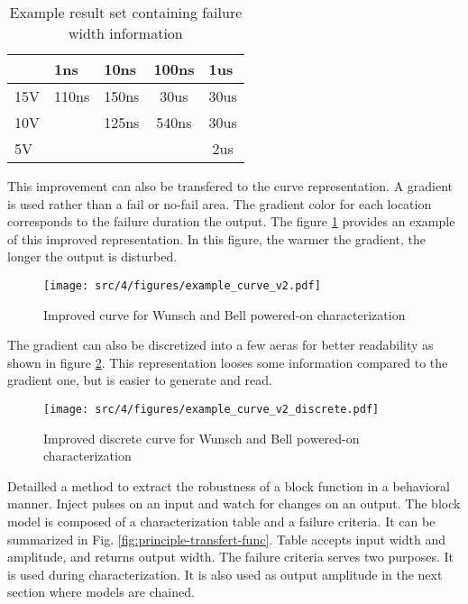 \begin{table}[!h]
\centering
\begin{tabular}{@{}lcccc@{}}
\toprule
    & \multicolumn{1}{l}{1ns}      & \multicolumn{1}{l}{10ns}     & \multicolumn{1}{l}{100ns}    & \multicolumn{1}{l}{1us}     \\ \midrule
15V & {\color[HTML]{00D2CB} 110ns} & {\color[HTML]{FFCB2F} 150ns} & {\color[HTML]{FE0000} 30us}  & {\color[HTML]{FE0000} 30us} \\
10V & {\color[HTML]{32CB00} }      & {\color[HTML]{00D2CB} 125ns} & {\color[HTML]{F8A102} 540ns} & {\color[HTML]{FE0000} 30us} \\
5V  & {\color[HTML]{32CB00} }      & {\color[HTML]{32CB00} }      & {\color[HTML]{32CB00} }      & {\color[HTML]{F56B00} 2us}  \\
\bottomrule
\end{tabular}
\caption{Example result set containing failure width information}
\label{simulation-results-bis}
\end{table}

This improvement can also be transfered to the curve representation.
A gradient is used rather than a fail or no-fail area.
The gradient color for each location corresponds to the failure duration the output.
The figure \ref{wb_cz_curve_example_v2} provides an example of this improved representation.
In this figure, the warmer the gradient, the longer the output is disturbed.

\begin{figure}[!h]
  \centering
  \texttt{[image: src/4/figures/example\_curve\_v2.pdf]}
  \caption{Improved curve for Wunsch and Bell powered-on characterization}
  \label{wb_cz_curve_example_v2}
\end{figure}

The gradient can also be discretized into a few aeras for better readability as shown in figure \ref{wb_cz_curve_example_v2_discrete}.
This representation looses some information compared to the gradient one, but is easier to generate and read.

\begin{figure}[!h]
  \centering
  \texttt{[image: src/4/figures/example\_curve\_v2\_discrete.pdf]}
  \caption{Improved discrete curve for Wunsch and Bell powered-on characterization}
  \label{wb_cz_curve_example_v2_discrete}
\end{figure}

Detailled a method to extract the robustness of a block function in a behavioral manner.
Inject pulses on an input and watch for changes on an output.
The block model is composed of a characterization table and a failure criteria.
It can be summarized in Fig. \ref{fig:principle-transfert-func}.
Table accepts input width and amplitude, and returns output width.
The failure criteria serves two purposes.
It is used during characterization.
It is also used as output amplitude in the next section where models are chained.


